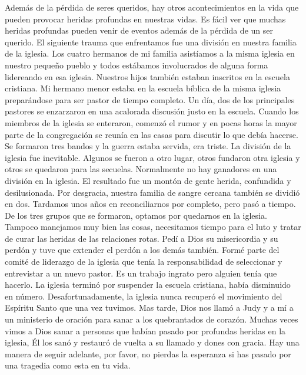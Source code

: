 \documentclass[twoside, 12pt]{book}
\begin{document}
Además de la pérdida de seres queridos, hay otros acontecimientos en la vida que pueden provocar heridas profundas en nuestras vidas. Es fácil ver que muchas heridas profundas pueden venir de eventos además de la pérdida de un ser querido. El siguiente trauma que enfrentamos fue una división en nuestra familia de la iglesia. Los cuatro hermanos de mi familia asistíamos a la misma iglesia en nuestro pequeño pueblo y todos estábamos involucrados de alguna forma lidereando en esa iglesia. Nuestros hijos también estaban inscritos en la escuela cristiana. Mi hermano menor estaba en la escuela bíblica de la misma iglesia preparándose para ser pastor de tiempo completo. Un día, dos de los principales pastores se enzarzaron en una acalorada discusión justo en la escuela. Cuando los miembros de la iglesia se enteraron, comenzó el rumor y en pocas horas la mayor parte de la congregación se reunía en las casas para discutir lo que debía hacerse. Se formaron tres bandos y la guerra estaba servida, era triste. La división de la iglesia fue inevitable. Algunos se fueron a otro lugar, otros fundaron otra iglesia y otros se quedaron para las secuelas. Normalmente no hay ganadores en una división en la iglesia. El resultado fue un montón de gente herida, confundida y desilusionada. Por desgracia, nuestra familia de sangre cercana también se dividió en dos. Tardamos unos años en reconciliarnos por completo, pero pasó a tiempo.\\

De los tres grupos que se formaron, optamos por quedarnos en la iglesia. Tampoco manejamos muy bien las cosas, necesitamos tiempo para el luto y tratar de curar las heridas de las relaciones rotas. Pedí a Dios su misericordia y su perdón y tuve que extender el perdón a los demás también. Formé parte del comité de liderazgo de la iglesia que tenía la responsabilidad de seleccionar y entrevistar a un nuevo pastor. Es un trabajo ingrato pero alguien tenía que hacerlo. La iglesia terminó por suspender la escuela cristiana, había disminuido en número. Desafortunadamente, la iglesia nunca recuperó el movimiento del Espíritu Santo que una vez tuvimos. Mas tarde, Dios nos llamó a Judy y a mí a un ministerio de oración para sanar a los quebrantados de corazón. Muchas veces vimos a Dios sanar a personas que habían pasado por profundas heridas en la iglesia, Él los sanó y restauró de vuelta a su llamado y dones con gracia. Hay una manera de seguir adelante, por favor, no pierdas la esperanza si has pasado por una tragedia como esta en tu vida.\\
\end{document}
